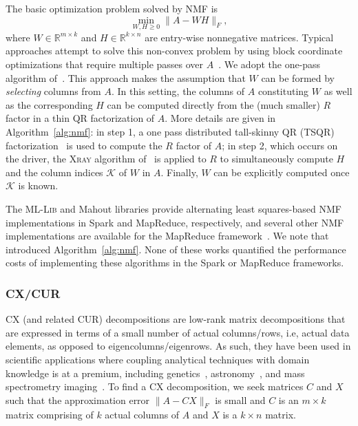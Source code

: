 The basic optimization problem solved by NMF is
\begin{equation}
\min_{W,H \geq 0} \|A - WH\|_F,
\end{equation}
where $W \in \mathbb{R}^{m \times k}$ and $H \in \mathbb{R}^{k \times n}$ are entry-wise nonnegative matrices. Typical approaches attempt to solve this non-convex problem by using block coordinate optimizations that require multiple passes over $A$~\cite{kim2014algorithms}. We adopt the one-pass algorithm of~\cite{benson2014scalable}. This approach makes the assumption that $W$ can be formed by {\it selecting} columns from $A$. In this setting, the columns of $A$ constituting $W$ as well as the corresponding $H$ can be computed directly from the (much smaller) $R$ factor in a thin QR factorization of $A$. More details are given in Algorithm~\ref{alg:nmf}: in step 1, a one pass distributed tall-skinny QR (\textsc{TSQR}) factorization~\cite{demmel12} is used to compute the $R$ factor of $A$; in step 2, which occurs on the driver, the \textsc{Xray} algorithm of~\cite{kumar13} is applied to $R$ to simultaneously compute $H$ and the column indices $\mathcal{K}$ of $W$ in $A$. Finally, $W$ can be explicitly computed once $\mathcal{K}$ is known.

The \textsc{ML-Lib} and Mahout libraries provide alternating least squares-based NMF implementations in Spark and MapReduce, respectively, and several other NMF implementations are available for the MapReduce framework~\cite{liu2010distributed,Liao201448,benson2014scalable}. We note that~\cite{benson2014scalable} introduced Algorithm~\ref{alg:nmf}. None of these works quantified the performance costs of implementing these algorithms in the Spark or MapReduce frameworks.

\subsubsection{CX/CUR}
CX (and related CUR) decompositions are
low-rank matrix decompositions that are expressed in terms of a small number of actual columns/rows, i.e, actual data elements, as opposed to eigencolumns/eigenrows.  
As such, they have been used in scientific applications where coupling analytical techniques with domain knowledge is at a premium, including
genetics~\cite{Paschou07b}, astronomy~\cite{Yip14-AJ}, and mass spectrometry imaging~\cite{YRPMB15}. To find a CX decomposition, we seek matrices $C$ and $X$ such that the approximation error $\|A-CX\|_F$ is small and $C$ is an $m\times k$ matrix comprising of $k$
actual columns of $A$ and $X$ is a $k \times n$ matrix.


